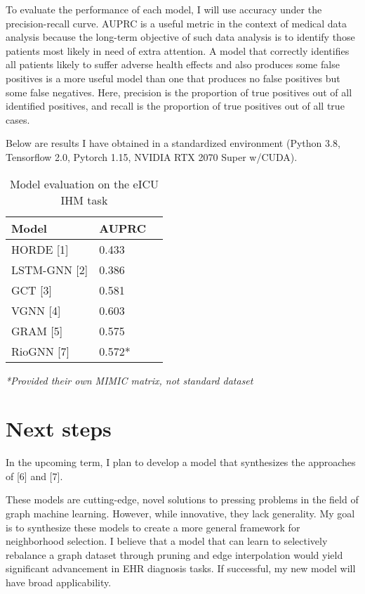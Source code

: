 \documentclass{article}
\begin{document}
To evaluate the performance of each model, I will use accuracy under the precision-recall curve. AUPRC is a useful metric in the context of medical data analysis because the long-term objective of such data analysis is to identify those patients most likely in need of extra attention. A model that correctly identifies all patients likely to suffer adverse health effects and also produces some false positives is a more useful model than one that produces no false positives but some false negatives. Here, precision is the proportion of true positives out of all identified positives, and recall is the proportion of true positives out of all true cases.

Below are results I have obtained in a standardized environment (Python 3.8, Tensorflow 2.0, Pytorch 1.15, NVIDIA RTX 2070 Super w/CUDA).
\newline 
\begin{table} [htbp!]
  \caption{Model evaluation on the eICU IHM task}
  \label{results-comp-table}
  \centering
  \begin{tabular}{lll}
    \toprule
    Model     & AUPRC  \\
    \midrule
    HORDE [1]     & 0.433 \\
    LSTM-GNN [2] & 0.386  \\
    GCT [3] & 0.581 \\
    VGNN [4]     & 0.603    \\
    GRAM [5]     & 0.575 \\
    RioGNN [7] & 0.572*
    
    \bottomrule
  \end{tabular}
\end{table}

\emph{*Provided their own MIMIC matrix, not standard dataset}

\section{Next steps}
\label{future}

In the upcoming term, I plan to develop a model that synthesizes the approaches of [6] and [7]. 


These models are cutting-edge, novel solutions to pressing problems in the field of graph machine learning. However, while innovative, they lack generality. My goal is to synthesize these models to create a more general framework for neighborhood selection. I believe that a model that can learn to selectively rebalance a graph dataset through pruning and edge interpolation would yield significant advancement in EHR diagnosis tasks. If successful, my new model will have broad applicability.
\end{document}

